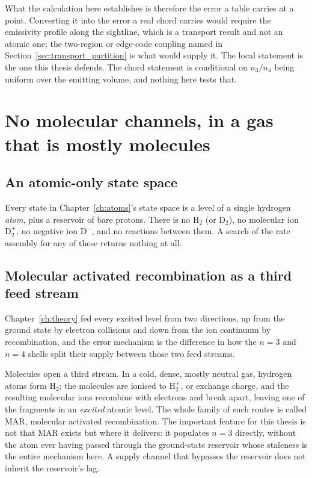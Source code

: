 What the calculation here establishes is therefore the error a table carries at
a point. Converting it into the error a real chord carries would require the
emissivity profile along the sightline, which is a transport result and not an
atomic one; the two-region or edge-code coupling named in
Section~\ref{sec:transport_partition} is what would supply it. The local
statement is the one this thesis defends. The chord statement is conditional on
$n_3/n_4$ being uniform over the emitting volume, and nothing here tests that.

\section{No molecular channels, in a gas that is mostly molecules}
\label{sec:molecules}

\subsection{An atomic-only state space}

Every state in Chapter~\ref{ch:atoms}'s state space is a level of a single
hydrogen \emph{atom}, plus a reservoir of bare protons. There is no
$\mathrm{H}_2$ (or $\mathrm{D}_2$), no molecular ion $\mathrm{D}_2^+$, no
negative ion $\mathrm{D}^-$, and no reactions between them. A search of the rate
assembly for any of these returns nothing at all.

\subsection{Molecular activated recombination as a third feed stream}

Chapter~\ref{ch:theory} fed every excited level from two directions, up from
the ground state by electron collisions and down from the ion continuum by
recombination, and the error mechanism is the difference in how the $n=3$ and
$n=4$ shells split their supply between those two feed streams.

Molecules open a third stream. In a cold, dense, mostly neutral gas, hydrogen
atoms form $\mathrm{H}_2$; the molecules are ionised to $\mathrm{H}_2^+$, or
exchange charge, and the resulting molecular ions recombine with electrons and
break apart, leaving one of the fragments in an \emph{excited} atomic level. The
whole family of such routes is called MAR, molecular activated recombination.
The important feature for this thesis is not that MAR exists but where it
delivers: it populates $n=3$ directly, without the atom ever having passed
through the ground-state reservoir whose staleness is the entire mechanism here.
A supply channel that bypasses the reservoir does not inherit the reservoir's
lag.

